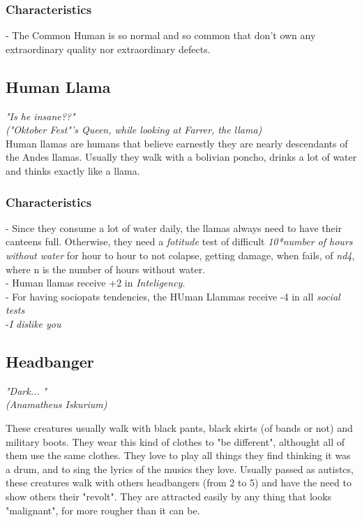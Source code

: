 \documentclass[ letterpaper,12pt]{article}
\begin{document}
\subsubsection{Characteristics}
- The Common Human is so normal and so common that don't own any extraordinary quality nor extraordinary defects.

\subsection{Human Llama}
{\it "Is he insane??"\\
("Oktober Fest"'s Queen, while looking at Farrer, the llama)}\\

Human llamas are humans that believe earnestly they are nearly descendants of the Andes llamas. Usually they walk with a bolivian poncho, drinks a lot of water and thinks exactly like a llama.

\subsubsection{Characteristics}
- Since they consume a lot of water daily, the llamas always need to have their canteens full. Otherwise, they need a {\it fotitude} test of difficult {\it 10*number of hours without water} for hour to hour to not colapse, getting damage, when fails, of {\it nd4}, where n is the number of hours without water.\\
- Human llamas receive +2 in {\it Inteligency}.\\
- For having sociopats tendencies, the HUman Llammas receive -4 in all {\it social tests}\\
-{\it I dislike you}\\

\subsection{Headbanger}
{\it "Dark... "\\
(Anamatheus Iskurium)\\}

These creatures usually walk with black pants, black skirts (of bands or not) and military boots. They wear this kind of clothes to "be different", althought all of them use the same clothes. They love to play all things they find thinking it was a drum, and to sing the lyrics of the musics they love. Usually passed as autistcs, these creatures walk with others headbangers (from 2 to 5) and have the need to show others their "revolt". They are attracted easily by any thing that looks "malignant", for more rougher than it can be.
\end{document}
